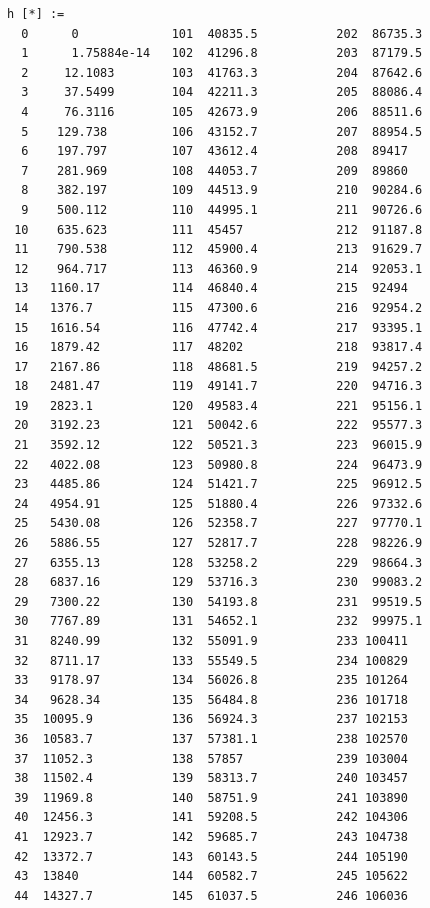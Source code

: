 \documentclass{article}
\begin{document}
\begin{verbatim}
h [*] :=
  0      0             101  40835.5           202  86735.3
  1      1.75884e-14   102  41296.8           203  87179.5
  2     12.1083        103  41763.3           204  87642.6
  3     37.5499        104  42211.3           205  88086.4
  4     76.3116        105  42673.9           206  88511.6
  5    129.738         106  43152.7           207  88954.5
  6    197.797         107  43612.4           208  89417
  7    281.969         108  44053.7           209  89860
  8    382.197         109  44513.9           210  90284.6
  9    500.112         110  44995.1           211  90726.6
 10    635.623         111  45457             212  91187.8
 11    790.538         112  45900.4           213  91629.7
 12    964.717         113  46360.9           214  92053.1
 13   1160.17          114  46840.4           215  92494
 14   1376.7           115  47300.6           216  92954.2
 15   1616.54          116  47742.4           217  93395.1
 16   1879.42          117  48202             218  93817.4
 17   2167.86          118  48681.5           219  94257.2
 18   2481.47          119  49141.7           220  94716.3
 19   2823.1           120  49583.4           221  95156.1
 20   3192.23          121  50042.6           222  95577.3
 21   3592.12          122  50521.3           223  96015.9
 22   4022.08          123  50980.8           224  96473.9
 23   4485.86          124  51421.7           225  96912.5
 24   4954.91          125  51880.4           226  97332.6
 25   5430.08          126  52358.7           227  97770.1
 26   5886.55          127  52817.7           228  98226.9
 27   6355.13          128  53258.2           229  98664.3
 28   6837.16          129  53716.3           230  99083.2
 29   7300.22          130  54193.8           231  99519.5
 30   7767.89          131  54652.1           232  99975.1
 31   8240.99          132  55091.9           233 100411
 32   8711.17          133  55549.5           234 100829
 33   9178.97          134  56026.8           235 101264
 34   9628.34          135  56484.8           236 101718
 35  10095.9           136  56924.3           237 102153
 36  10583.7           137  57381.1           238 102570
 37  11052.3           138  57857             239 103004
 38  11502.4           139  58313.7           240 103457
 39  11969.8           140  58751.9           241 103890
 40  12456.3           141  59208.5           242 104306
 41  12923.7           142  59685.7           243 104738
 42  13372.7           143  60143.5           244 105190
 43  13840             144  60582.7           245 105622
 44  14327.7           145  61037.5           246 106036

\end{verbatim}
\end{document}
